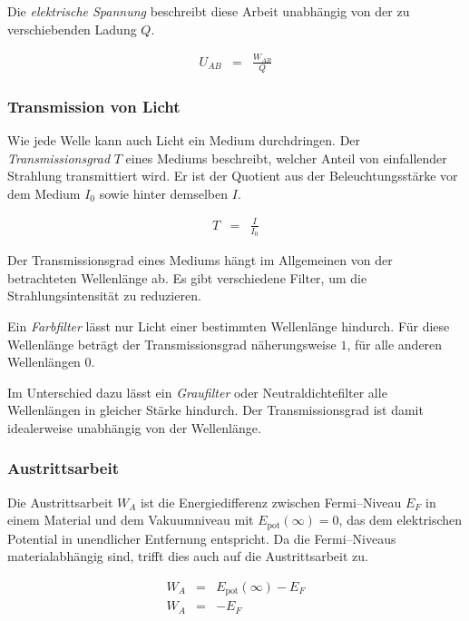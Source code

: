 \documentclass[12pt,a4paper]{scrartcl}
\numberwithin{equation}{section} %
\begin{document}
Die \emph{elektrische Spannung} beschreibt diese Arbeit unabhängig von der zu verschiebenden Ladung $Q$. \cite{Gerthsen}

\begin{eqnarray}
	U_{AB} &=& \frac{W_{AB}}{Q}
\end{eqnarray}

\subsubsection{Transmission von Licht}
Wie jede Welle kann auch Licht ein Medium durchdringen. Der \emph{Transmissionsgrad} $T$ eines Mediums beschreibt, welcher Anteil von einfallender Strahlung transmittiert wird. Er ist der Quotient aus der Beleuchtungsstärke vor dem Medium $I_0$ sowie hinter demselben $I$. \cite{Gerthsen}

\begin{eqnarray}
	T &=& \frac{I}{I_0}
\end{eqnarray}

\noindent
Der Transmissionsgrad eines Mediums hängt im Allgemeinen von der betrachteten Wellenlänge ab. Es gibt verschiedene Filter, um die Strahlungsintensität zu reduzieren.

Ein \emph{Farbfilter} lässt nur Licht einer bestimmten Wellenlänge hindurch. Für diese Wellenlänge beträgt der Transmissionsgrad näherungsweise $1$, für alle anderen Wellenlängen $0$. %

Im Unterschied dazu lässt ein \emph{Graufilter} oder Neutraldichtefilter alle Wellenlängen in gleicher Stärke hindurch. Der Transmissionsgrad ist damit idealerweise unabhängig von der Wellenlänge. %

\subsubsection{Austrittsarbeit}
Die Austrittsarbeit $W_A$ ist die Energiedifferenz zwischen Fermi--Niveau $E_F$ in einem Material und dem Vakuumniveau mit $E_\mathrm{pot}(\infty)=0$, das dem elektrischen Potential in unendlicher Entfernung entspricht. Da die Fermi--Niveaus materialabhängig sind, trifft dies auch auf die Austrittsarbeit zu. \cite{Demtröder}

\begin{eqnarray}
	W_A &=& E_\mathrm{pot}(\infty) - E_F \\
	W_A &=& -E_F
\end{eqnarray}
\end{document}
